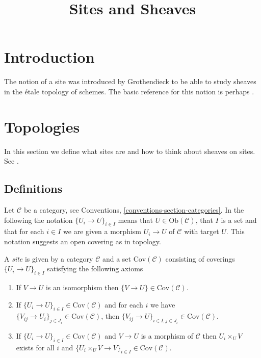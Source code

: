 

%


\title{Sites and Sheaves}


\maketitle

\tableofcontents

\section{Introduction}
\label{section-introduction}

\noindent
The notion of a site was introduced by Grothendieck to be able to study
sheaves in the \'etale topology of schemes. The basic reference for this
notion is perhaps \cite{SGA4}. 

\section{Topologies}
\label{section-topologies}

\noindent
In this section we define what sites are and how to think about sheaves
on sites. See \cite{ArtinTopologies}.

\subsection{Definitions}
\label{subsection-sites-definitions}

\noindent
Let $\mathcal{C}$ be a category, see
Conventions, \autoref{conventions-section-categories}. 
In the following the notation $\{U_i \to U\}_{i\in I}$ means that 
$U \in \text{Ob}(\mathcal{C})$, that $I$ is a set and that for each $i\in I$ 
we are given a morphism $U_i \to U$ of $\mathcal{C}$ with target $U$. This
notation suggests an open covering as in topology.

\begin{definition}
\label{definition-site}
A {\it site} is given by a category $\mathcal{C}$ and a set 
$\text{Cov}(\mathcal{C})$ consisting of coverings 
$\{U_i \to U\}_{i \in I}$ satisfying the following axioms
\begin{enumerate}
\item If $V \to U$ is an isomorphism then $\{V \to U\} \in 
\text{Cov}(\mathcal{C})$.
\item If $\{U_i \to U\}_{i\in I} \in \text{Cov}(\mathcal{C})$ and for each
$i$ we have $\{V_{ij} \to U_i\}_{j\in J_i} \in \text{Cov}(\mathcal{C})$, then
$\{V_{ij} \to U\}_{i \in I, j\in J_i} \in \text{Cov}(\mathcal{C})$.
\item If $\{U_i \to U\}_{i\in I}\in \text{Cov}(\mathcal{C})$
and $V \to U$ is a morphism of $\mathcal{C}$ then $U_i \times_U V$
exists for all $i$ and
$\{U_i \times_U V \to V \}_{i\in I} \in \text{Cov}(\mathcal{C})$.
\end{enumerate}
\end{definition}

